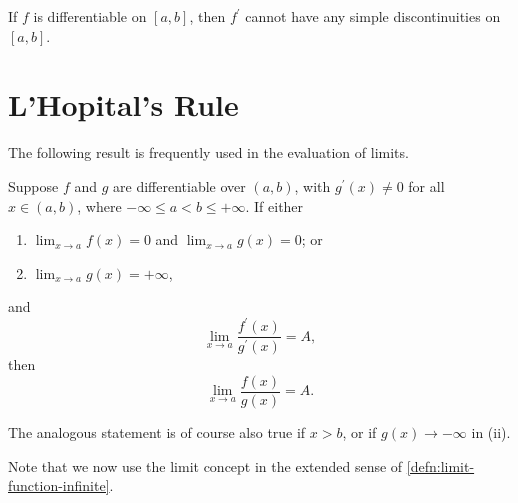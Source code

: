 \begin{corollary}
If $f$ is differentiable on $[a,b]$, then $f^\prime$ cannot have any simple discontinuities on $[a,b]$.
\end{corollary}
\pagebreak

\section{L'Hopital's Rule}
The following result is frequently used in the evaluation of limits.

\begin{lemma}
Suppose $f$ and $g$ are differentiable over $(a,b)$, with $g^\prime(x)\neq0$ for all $x\in(a,b)$, where $-\infty\le a<b\le+\infty$. 
If either
\begin{enumerate}[label=(\roman*)]
\item $\displaystyle\lim_{x\to a}f(x)=0$ and $\displaystyle\lim_{x\to a}g(x)=0$; or
\item $\displaystyle\lim_{x\to a}g(x)=+\infty$,
\end{enumerate}
and
\[\lim_{x\to a}\frac{f^\prime(x)}{g^\prime(x)}=A,\]
then
\[\lim_{x\to a}\frac{f(x)}{g(x)}=A.\]
\end{lemma}

The analogous statement is of course also true if $x>b$, or if $g(x)\to-\infty$ in (ii).

Note that we now use the limit concept in the extended sense of \cref{defn:limit-function-infinite}.

